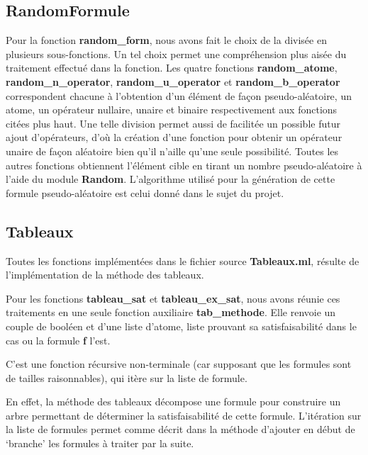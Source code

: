 \documentclass[12pt]{article}
\begin{document}
    \subsection{RandomFormule}\label{random-form}

    Pour la fonction \textbf{random\_form}, nous avons fait le choix de la 
    divisée en plusieurs sous-fonctions. Un tel choix permet une compréhension 
    plus aisée du traitement effectué dans la fonction. Les quatre fonctions 
    \textbf{random\_atome}, \textbf{random\_n\_operator}, 
    \textbf{random\_u\_operator} et \textbf{random\_b\_operator} correspondent 
    chacune à l'obtention d'un élément de façon pseudo-aléatoire, un atome, un 
    opérateur nullaire, unaire et binaire respectivement aux fonctions citées 
    plus haut. Une telle division permet aussi de facilitée un possible futur 
    ajout d'opérateurs, d'où la création d'une fonction pour obtenir un 
    opérateur unaire de façon aléatoire bien qu'il n'aille qu'une seule 
    possibilité. Toutes les autres fonctions obtiennent l'élément cible en 
    tirant un nombre pseudo-aléatoire à l'aide du module \textbf{Random}. 
    L'algorithme utilisé pour la génération de cette formule pseudo-aléatoire 
    est celui donné dans le sujet du projet.

    \subsection{Tableaux}

    Toutes les fonctions implémentées dans le fichier source \textbf{Tableaux.ml}, 
    résulte de l'implémentation de la méthode des tableaux.   

    \vphantom{}

    Pour les fonctions \textbf{tableau\_sat} et \textbf{tableau\_ex\_sat}, nous 
    avons réunie ces traitements en une seule fonction auxiliaire 
    \textbf{tab\_methode}. Elle renvoie un couple de booléen et d'une liste 
    d'atome, liste prouvant sa satisfaisabilité dans le cas ou la formule 
    \textbf{f} l'est. 

    C'est une fonction récursive non-terminale (car supposant que les formules 
    sont de tailles raisonnables), qui itère sur la liste de formule.

    En effet, la méthode des tableaux décompose une formule pour construire un 
    arbre permettant de déterminer la satisfaisabilité de cette formule. 
    L'itération sur la liste de formules permet comme décrit dans la méthode 
    d'ajouter en début de `branche' les formules à traiter par la suite. 
\end{document}
